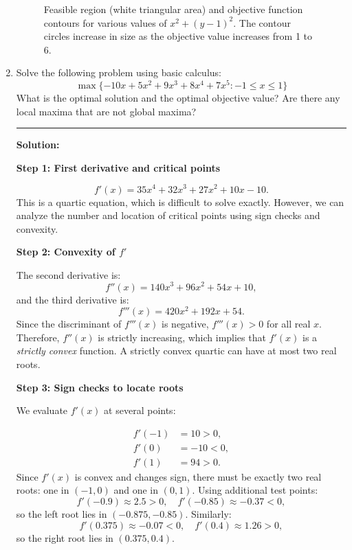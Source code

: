 \documentclass[11pt]{article}
\begin{document}
\begin{enumerate}[leftmargin=*, itemsep=1.5em]
\begin{figure}[H]
    \caption{Feasible region (white triangular area) and objective function contours for various values of $x^2 + (y - 1)^2$. The contour circles increase in size as the objective value increases from 1 to 6.}
    \label{fig:hw1_a1to6}
\end{figure}



\item Solve the following problem using basic calculus:
\[
\max\{ -10x + 5x^{2}+9x^{3}+ 8x^{4}+7x^{5}:  -1 \le x \le 1\}
\]
What is the optimal solution and the optimal objective value? Are there any local maxima that are not global maxima? 


\vspace{0.5em}
\noindent\rule{\textwidth}{0.5pt}
\vspace{0.5em}

\noindent\textbf{Solution:}

\medskip
\noindent\textbf{Step 1: First derivative and critical points}

\[
f'(x) = 35x^4 + 32x^3 + 27x^2 + 10x - 10.
\]
This is a quartic equation, which is difficult to solve exactly.  
However, we can analyze the number and location of critical points using sign checks and convexity.

\medskip
\noindent\textbf{Step 2: Convexity of $f'$}

The second derivative is:
\[
f''(x) = 140x^3 + 96x^2 + 54x + 10,
\]
and the third derivative is:
\[
f'''(x) = 420x^2 + 192x + 54.
\]
Since the discriminant of $f'''(x)$ is negative, $f'''(x) > 0$ for all real $x$.  
Therefore, $f''(x)$ is strictly increasing, which implies that $f'(x)$ is a \emph{strictly convex} function.  
A strictly convex quartic can have at most two real roots.

\medskip
\noindent\textbf{Step 3: Sign checks to locate roots}

We evaluate $f'(x)$ at several points:

\[
\begin{aligned}
f'(-1) &= 10 > 0, \\
f'(0) &= -10 < 0, \\
f'(1) &= 94 > 0.
\end{aligned}
\]
Since $f'(x)$ is convex and changes sign, there must be exactly two real roots: one in $(-1,0)$ and one in $(0,1)$.  
Using additional test points:
\[
f'(-0.9) \approx 2.5 > 0, \quad f'(-0.85) \approx -0.37 < 0,
\]
so the left root lies in $(-0.875, -0.85)$.  
Similarly:
\[
f'(0.375) \approx -0.07 < 0,\quad f'(0.4) \approx 1.26 > 0,
\]
so the right root lies in $(0.375, 0.4)$.


\end{enumerate}
\end{document}
